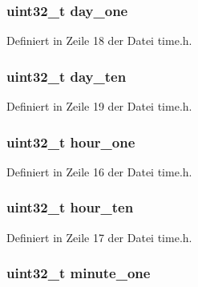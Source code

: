\subsubsection[{day\+\_\+one}]{\setlength{\rightskip}{0pt plus 5cm}uint32\+\_\+t day\+\_\+one}\label{structtime__date_aa49ac5f823611c03f3c3723f12047cfc}


Definiert in Zeile 18 der Datei time.\+h.

\hypertarget{structtime__date_af252ce7a893acb93c32d07d0330f900d}{}
\subsubsection[{day\+\_\+ten}]{\setlength{\rightskip}{0pt plus 5cm}uint32\+\_\+t day\+\_\+ten}\label{structtime__date_af252ce7a893acb93c32d07d0330f900d}


Definiert in Zeile 19 der Datei time.\+h.

\hypertarget{structtime__date_a338fe5a5db873c63189f9c98bf0376fc}{}
\subsubsection[{hour\+\_\+one}]{\setlength{\rightskip}{0pt plus 5cm}uint32\+\_\+t hour\+\_\+one}\label{structtime__date_a338fe5a5db873c63189f9c98bf0376fc}


Definiert in Zeile 16 der Datei time.\+h.

\hypertarget{structtime__date_a7315167bc0969310bcaedee5699243e5}{}
\subsubsection[{hour\+\_\+ten}]{\setlength{\rightskip}{0pt plus 5cm}uint32\+\_\+t hour\+\_\+ten}\label{structtime__date_a7315167bc0969310bcaedee5699243e5}


Definiert in Zeile 17 der Datei time.\+h.

\hypertarget{structtime__date_aeb047e7931fb6cd6e4c751d8143c16a4}{}
\subsubsection[{minute\+\_\+one}]{\setlength{\rightskip}{0pt plus 5cm}uint32\+\_\+t minute\+\_\+one}\label{structtime__date_aeb047e7931fb6cd6e4c751d8143c16a4}


